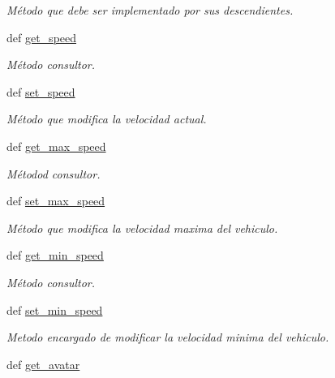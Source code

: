 \begin{DoxyCompactItemize}
\begin{DoxyCompactList}\small\item\em \-Método que debe ser implementado por sus descendientes. \end{DoxyCompactList}\item 
def \hyperlink{classengine_1_1basiccar_1_1BasicCar_a7842c83e1796e2d4c0d6a625c53029b2}{get\-\_\-speed}
\begin{DoxyCompactList}\small\item\em \-Método consultor. \end{DoxyCompactList}\item 
def \hyperlink{classengine_1_1basiccar_1_1BasicCar_ab1e0b46d8e078c3a21856389bd8129da}{set\-\_\-speed}
\begin{DoxyCompactList}\small\item\em \-Método que modifica la velocidad actual. \end{DoxyCompactList}\item 
def \hyperlink{classengine_1_1basiccar_1_1BasicCar_a6d49323b830a520d64ba1991e9a01c2d}{get\-\_\-max\-\_\-speed}
\begin{DoxyCompactList}\small\item\em \-Métodod consultor. \end{DoxyCompactList}\item 
def \hyperlink{classengine_1_1basiccar_1_1BasicCar_a746eb8a3b9a59cdf406aba5c0111fbc6}{set\-\_\-max\-\_\-speed}
\begin{DoxyCompactList}\small\item\em \-Método que modifica la velocidad maxima del vehiculo. \end{DoxyCompactList}\item 
def \hyperlink{classengine_1_1basiccar_1_1BasicCar_a579ad21c9afe7af621b33dd2b98bf3ff}{get\-\_\-min\-\_\-speed}
\begin{DoxyCompactList}\small\item\em \-Método consultor. \end{DoxyCompactList}\item 
def \hyperlink{classengine_1_1basiccar_1_1BasicCar_a485b347f1f3bfd117c3c93df40440d71}{set\-\_\-min\-\_\-speed}
\begin{DoxyCompactList}\small\item\em \-Metodo encargado de modificar la velocidad minima del vehiculo. \end{DoxyCompactList}\item 
def \hyperlink{classengine_1_1basiccar_1_1BasicCar_ae279c10b73fd8f55387dbc426922da25}{get\-\_\-avatar}

\end{DoxyCompactItemize}
